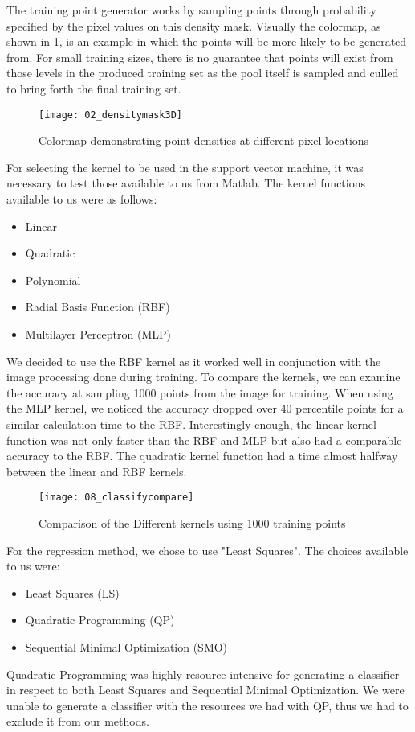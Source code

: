 The training point generator works by sampling points through probability specified by the pixel values on this density mask. Visually the colormap, as shown in \ref{fig:02_densitymask3D}, is an example in which the points will be more likely to be generated from. For small training sizes, there is no guarantee that points will exist from those levels in the produced training set as the pool itself is sampled and culled to bring forth the final training set.

\begin{figure}[p]
    \centering
    \texttt{[image: 02\_densitymask3D]}
    \caption{Colormap demonstrating point densities at different pixel locations}
    \label{fig:02_densitymask3D}
\end{figure}


For selecting the kernel to be used in the support vector machine, it was necessary to test those available to us from Matlab. The kernel functions available to us were as follows:

\begin{itemize}
  \item Linear
  \item Quadratic
  \item Polynomial
  \item Radial Basis Function (RBF)
  \item Multilayer Perceptron (MLP)
\end{itemize}

We decided to use the RBF kernel as it worked well in conjunction with the image processing done during training. To compare the kernels, we can examine the accuracy at sampling 1000 points from the image for training. When using the MLP kernel, we noticed the accuracy dropped over 40 percentile points for a similar calculation time to the RBF. Interestingly enough, the linear kernel function was not only faster than the RBF and MLP but also had a comparable accuracy to the RBF. The
quadratic kernel function had a time almost halfway between the linear and RBF kernels.

\begin{figure}[h]
    \centering
    \texttt{[image: 08\_classifycompare]}
    \caption{Comparison of the Different kernels using 1000 training points}
    \label{fig:08_classifycompare}
\end{figure}


For the regression method, we chose to use "Least Squares". The choices available to us were:

\begin{itemize}
  \item Least Squares (LS)
  \item Quadratic Programming (QP)
  \item Sequential Minimal Optimization (SMO)
\end{itemize}

Quadratic Programming was highly resource intensive for generating a classifier in respect to both Least Squares and Sequential Minimal Optimization. We were unable to generate a classifier with the resources we had with QP, thus we had to exclude it from our methods. 
